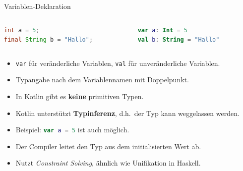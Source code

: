 \documentclass{beamer}
\begin{document}
\begin{frame}[fragile]{Variablen-Deklaration}
  \begin{columns}
    \begin{column}{0.5\textwidth}
      \begin{lstlisting}[language=Java, title=Java, xleftmargin=1em]
int a = 5;
final String b = "Hallo";
      \end{lstlisting}
    \end{column}
    \begin{column}{0.5\textwidth}
      \begin{lstlisting}[language=Kotlin, title=Kotlin, xleftmargin=1em, numbers=none]
var a: Int = 5
val b: String = "Hallo"
      \end{lstlisting}
    \end{column}
  \end{columns}
  \pause\vspace{0.5cm}
  \begin{itemize}
    \item \texttt{var} für veränderliche Variablen, \texttt{val} für unveränderliche Variablen.
    \item Typangabe nach dem Variablennamen mit Doppelpunkt.
    \item In Kotlin gibt es \textbf{keine} primitiven Typen. %
  \end{itemize}
  \pause\vspace{0.5cm}
  \begin{itemize}
    \item Kotlin unterstützt \textbf{Typinferenz}, d.h.\ der Typ kann weggelassen werden.
    \item Beispiel: \lstinline[language=kotlin]|var a = 5| ist auch möglich. %
    \item Der Compiler leitet den Typ aus dem initialisierten Wert ab.
    \item Nutzt \textit{Constraint Solving}, ähnlich wie Unifikation in Haskell.
  \end{itemize}
  \end{frame}
\end{document}
